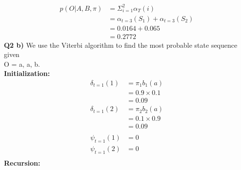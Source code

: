 \documentclass[12pt]{article}
\begin{document}
\begin{equation}
	\begin{aligned}
		p(O | A, B, \pi) &= \Sigma_{i=1}^2 \alpha_T(i)\\
		&=\alpha_{t=3}(S_1) + \alpha_{t=3}(S_2)\\
		&= 0.0164 + 0.065\\
		&= 0.2772
	\end{aligned}
\end{equation}
\textbf{Q2 b)} 
We use the Viterbi algorithm to find the most probable state sequence given \\O = a, a, b.\\
\textbf{Initialization:}
\begin{equation}
	\begin{aligned}
		\delta_{t=1}(1) &= \pi_{1}b_{1}(a) \\
		& = 0.9 \times 0.1 \\
		& = 0.09 \\
		\delta_{t=1}(2) &= \pi_{2}b_{2}(a) \\
		& = 0.1 \times 0.9 \\
		& = 0.09 \\ \\
		\psi_{t=1}(1) &= 0 \\
		 \psi_{t=1}(2) &= 0 \\ 
	\end{aligned}
\end{equation}
\textbf{Recursion:}
\end{document}
